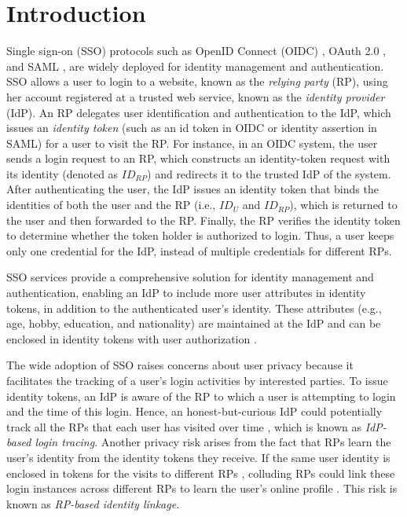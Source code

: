 \section{Introduction}
\label{sec:intro}
Single sign-on (SSO) protocols such as OpenID Connect (OIDC) \cite{OpenIDConnect}, OAuth 2.0 \cite{rfc6749}, and SAML \cite{SAML, SAMLIdentifier}, are widely deployed for identity management and authentication.
SSO allows a user to login to a website,
 known as the \emph{relying party} (RP), using her account registered at a trusted web service, known as the \emph{identity provider} (IdP).
An RP delegates user identification and authentication to the IdP, which issues an \emph{identity token} (such as an id token in OIDC or identity assertion in SAML) for a user to visit the RP. %
For instance, in an OIDC system, the user sends a login request to an RP,
which constructs an identity-token request with its identity (denoted as $ID_{RP}$) and redirects it to the trusted IdP of the system.
After authenticating the user, the IdP issues an identity token that binds the identities of both the user and the RP (i.e., $ID_U$ and $ID_{RP}$), which is returned to the user and then forwarded to the RP.
Finally, the RP verifies the identity token to determine whether the token holder is authorized to login.
Thus, a user keeps only one credential for the IdP, instead of multiple credentials for different RPs.

SSO services provide a comprehensive solution for identity management and authentication, enabling an IdP to include more user attributes in identity tokens, in addition to the authenticated user's identity.
These attributes (e.g., age, hobby, education, and nationality) are maintained at the IdP
 and can be enclosed in identity tokens with user authorization \cite{OpenIDConnect,rfc6749}.

The wide adoption of SSO raises concerns about user privacy \cite{NIST2017draft, SPRESSO, BrowserID, maler2008venn} because it facilitates the tracking of a user's login activities by interested parties.
To issue identity tokens, %
an IdP is aware of the RP to which a user is attempting to login and the time of this login.
Hence, an honest-but-curious IdP could potentially track all the RPs that each user has visited over time \cite{BrowserID,SPRESSO},
which is known as {\em IdP-based login tracing}.
Another privacy risk arises from the fact that RPs learn the user's identity from the identity tokens they receive.
If the same user identity is enclosed in tokens for the visits to different RPs \cite{maler2008venn, Google, FirefoxAccount}, colluding RPs could link these login instances across different RPs %
to learn the user's online profile \cite{maler2008venn}.
This risk is known as {\em RP-based identity linkage}.


